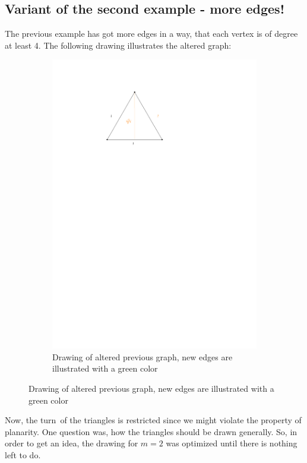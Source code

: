 \subsection{Variant of the second example - more edges!}
The previous example has got more edges in a way, that each vertex is of degree at least 4. The following drawing illustrates the altered graph:
\begin{figure}[H]
	\centering
	\begin{subfigure}{0.8\textwidth}
		\centering
		\includegraphics[page=6]{drawings/previous-results.pdf}
		\caption*{Drawing of altered previous graph, new edges are illustrated with a green color}
	\end{subfigure}
\end{figure}
Now, the \grqq turn\grqq~of the triangles is restricted since we might violate the property of planarity. One question was, how the triangles should be drawn generally. So, in order to get an idea, the drawing for $m=2$ was optimized until there is nothing left to do.
